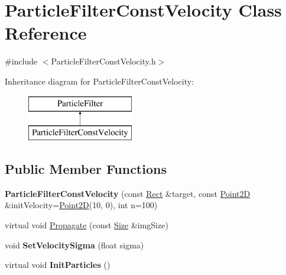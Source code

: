 \hypertarget{classParticleFilterConstVelocity}{}\section{Particle\+Filter\+Const\+Velocity Class Reference}
\label{classParticleFilterConstVelocity}


{\ttfamily \#include $<$Particle\+Filter\+Const\+Velocity.\+h$>$}

Inheritance diagram for Particle\+Filter\+Const\+Velocity\+:\begin{figure}[H]
\begin{center}
\leavevmode
\includegraphics[height=2.000000cm]{classParticleFilterConstVelocity}
\end{center}
\end{figure}
\subsection*{Public Member Functions}
\begin{DoxyCompactItemize}
\item 
\hypertarget{classParticleFilterConstVelocity_a705e639dc7d5fd70a8b332e888a4281c}{}{\bfseries Particle\+Filter\+Const\+Velocity} (const \hyperlink{classRect}{Rect} \&target, const \hyperlink{classPoint2D}{Point2\+D} \&init\+Velocity=\hyperlink{classPoint2D}{Point2\+D}(10, 0), int n=100)\label{classParticleFilterConstVelocity_a705e639dc7d5fd70a8b332e888a4281c}

\item 
virtual void \hyperlink{classParticleFilterConstVelocity_a72868ab78e4c4f49ce756e986839f993}{Propagate} (const \hyperlink{classSize}{Size} \&img\+Size)
\item 
\hypertarget{classParticleFilterConstVelocity_a91f6d8afede8039cd3ed08acbcb67b47}{}void {\bfseries Set\+Velocity\+Sigma} (float sigma)\label{classParticleFilterConstVelocity_a91f6d8afede8039cd3ed08acbcb67b47}

\item 
\hypertarget{classParticleFilterConstVelocity_a219193c3bdc2ed042c5473257227c3fb}{}virtual void {\bfseries Init\+Particles} ()\label{classParticleFilterConstVelocity_a219193c3bdc2ed042c5473257227c3fb}

\end{DoxyCompactItemize}
